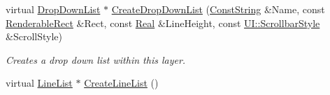 \begin{DoxyCompactItemize}
virtual \hyperlink{classMezzanine_1_1UI_1_1DropDownList}{DropDownList} $\ast$ \hyperlink{classMezzanine_1_1UI_1_1Layer_a6b0d315b69d28a29dddb3f19c22c8f8c}{CreateDropDownList} (\hyperlink{namespaceMezzanine_a63cd699ac54b73953f35ec9cfc05e506}{ConstString} \&Name, const \hyperlink{structMezzanine_1_1UI_1_1RenderableRect}{RenderableRect} \&Rect, const \hyperlink{namespaceMezzanine_a726731b1a7df72bf3583e4a97282c6f6}{Real} \&LineHeight, const \hyperlink{namespaceMezzanine_1_1UI_a5998a9bf372a7e92605c0c461736e763}{UI::ScrollbarStyle} \&ScrollStyle)
\begin{DoxyCompactList}\small\item\em Creates a drop down list within this layer. \item\end{DoxyCompactList}\item 
\hypertarget{classMezzanine_1_1UI_1_1Layer_a7dfff47a4e6791cd3dcf13d04374bd5c}{
virtual \hyperlink{classMezzanine_1_1UI_1_1LineList}{LineList} $\ast$ \hyperlink{classMezzanine_1_1UI_1_1Layer_a7dfff47a4e6791cd3dcf13d04374bd5c}{CreateLineList} ()}
\label{classMezzanine_1_1UI_1_1Layer_a7dfff47a4e6791cd3dcf13d04374bd5c}


\end{DoxyCompactItemize}
